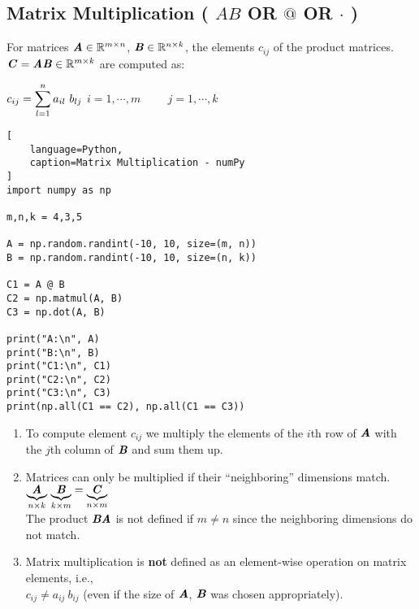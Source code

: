 \subsection{Matrix Multiplication ( $AB$ OR $@$ OR $\cdot$ ) \cite{mfml/book/mml/Deisenroth-Faisal-Ong}}

For matrices $\text{\textbf{\textit{A}}} \in \mathbb{R}^{m\times n}$, $\text{\textbf{\textit{B}}} \in \mathbb{R}^{n\times k}$, the elements $c_{ij}$ of the product matrices. $\text{\textbf{\textit{C}}} = \text{\textbf{\textit{AB}}} \in \mathbb{R}^{m\times k}$ are computed as:

\vspace{0.5cm}
\hfill
$
    c_{ij} = \dsum_{l=1}^n a_{il}\ b_{lj}
$
\hfill
$
    i = 1,\cdots,m
    \hspace{1cm}
    j = 1,\cdots,k
$
\hfill \cite{mfml/book/mml/Deisenroth-Faisal-Ong}





\begin{lstlisting}[
    language=Python,
    caption=Matrix Multiplication - numPy
]
import numpy as np

m,n,k = 4,3,5

A = np.random.randint(-10, 10, size=(m, n))
B = np.random.randint(-10, 10, size=(n, k))

C1 = A @ B
C2 = np.matmul(A, B)
C3 = np.dot(A, B)

print("A:\n", A)
print("B:\n", B)
print("C1:\n", C1)
print("C2:\n", C2)
print("C3:\n", C3)
print(np.all(C1 == C2), np.all(C1 == C3))
\end{lstlisting}




\vspace{0.5cm}

\begin{enumerate}
    \item To compute element $c_{ij}$ we multiply the elements of the $i$th row of $\text{\textbf{\textit{A}}}$ with the $j$th column of $\text{\textbf{\textit{B}}}$ and sum them up.
    \hfill \cite{mfml/book/mml/Deisenroth-Faisal-Ong}

    \item Matrices can only be multiplied if their “neighboring” dimensions match.
    \hfill \cite{mfml/book/mml/Deisenroth-Faisal-Ong}
    \\
    \hfill
    $
        \underset{n\times k}{\underbrace{\text{\textbf{\textit{A}}}}}\
        \underset{k\times m}{\underbrace{\text{\textbf{\textit{B}}}}}
        =
        \underset{n\times m}{\underbrace{\text{\textbf{\textit{C}}}}}
    $
    \hfill \cite{mfml/book/mml/Deisenroth-Faisal-Ong}
    \\
    The product $\text{\textbf{\textit{BA}}}$ is not defined if $m \neq n$ since the neighboring dimensions do not match.

    \item Matrix multiplication is \textbf{not} defined as an element-wise operation on matrix elements, i.e., 
    \\
    $c_{ij} \neq a_{ij}\ b_{ij}$ (even if the size of $\text{\textbf{\textit{A}}}$, $\text{\textbf{\textit{B}}}$ was chosen appropriately).
    \hfill \cite{mfml/book/mml/Deisenroth-Faisal-Ong}
\end{enumerate}


